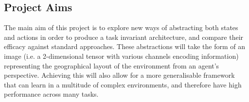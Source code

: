 \subsection{Project Aims}

The main aim of this project is to explore new ways of abstracting both states and actions in order to produce a task invariant architecture, and compare their efficacy against standard approaches. These abstractions will take the form of an image (i.e. a 2-dimensional tensor with various channels encoding information) representing the geographical layout of the environment from an agent's perspective. Achieving this will also allow for a more generalisable framework that can learn in a multitude of complex environments, and therefore have high performance across many tasks. 


